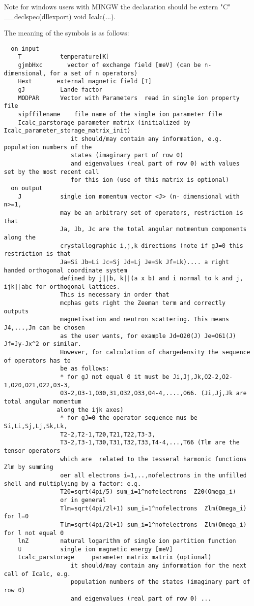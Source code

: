 Note for windows users with MINGW the declaration should be {\prg extern "C" \_\_declspec(dllexport) void %
Icalc(...)}.

The meaning of the symbols is as follows:
{\footnotesize
\begin{verbatim}
  on input
    T           temperature[K]
    gjmbHxc       vector of exchange field [meV] (can be n-dimensional, for a set of n operators)
    Hext       external magnetic field [T]
    gJ          Lande factor
    MODPAR      Vector with Parameters  read in single ion property file
    sipffilename    file name of the single ion parameter file
    Icalc_parstorage parameter matrix (initialized by Icalc_parameter_storage_matrix_init)
                   it should/may contain any information, e.g. population numbers of the
				   states (imaginary part of row 0)
                   and eigenvalues (real part of row 0) with values set by the most recent call
                   for this ion (use of this matrix is optional)
  on output    
    J           single ion momentum vector <J> (n- dimensional with n>=1,
                may be an arbitrary set of operators, restriction is that 
                Ja, Jb, Jc are the total angular motmentum components along the
                crystallographic i,j,k directions (note if gJ=0 this restriction is that
                Ja=Si Jb=Li Jc=Sj Jd=Lj Je=Sk Jf=Lk).... a right handed orthogonal coordinate system 
                defined by j||b, k||(a x b) and i normal to k and j, ijk||abc for orthogonal lattices. 
                This is necessary in order that
                mcphas gets right the Zeeman term and correctly outputs
                magnetisation and neutron scattering. This means J4,...,Jn can be chosen 
                as the user wants, for example Jd=O20(J) Je=O61(J) Jf=Jy-Jx^2 or similar.
                However, for calculation of chargedensity the sequence of operators has to
                be as follows: 
                * for gJ not equal 0 it must be Ji,Jj,Jk,O2-2,O2-1,O20,O21,O22,O3-3,
                O3-2,O3-1,O30,31,O32,O33,O4-4,....,O66. (Ji,Jj,Jk are total angular momentum
               along the ijk axes)
                * for gJ=0 the operator sequence mus be Si,Li,Sj,Lj,Sk,Lk,
                T2-2,T2-1,T20,T21,T22,T3-3,
                T3-2,T3-1,T30,T31,T32,T33,T4-4,...,T66 (Tlm are the tensor operators 
                which are  related to the tesseral harmonic functions Zlm by summing
                oer all electrons i=1,..,nofelectrons in the unfilled shell and multiplying by a factor: e.g.
                T20=sqrt(4pi/5) sum_i=1^nofelectrons  Z20(Omega_i)
                or in general
                Tlm=sqrt(4pi/2l+1) sum_i=1^nofelectrons  Zlm(Omega_i)  for l=0
                Tlm=sqrt(4pi/2l+1) sum_i=1^nofelectrons  Zlm(Omega_i)  for l not equal 0
    lnZ         natural logarithm of single ion partition function
    U           single ion magnetic energy [meV]
    Icalc_parstorage     parameter matrix matrix (optional)
                   it should/may contain any information for the next call of Icalc, e.g.
                   population numbers of the states (imaginary part of row 0)
                   and eigenvalues (real part of row 0) ...
\end{verbatim}
}
